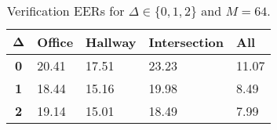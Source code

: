 \begin{table}[h]
    \centering
    \begin{tabular}{|c|M{2cm}|M{2cm}|M{2cm}|M{2cm}|}
    \hline
    $\boldsymbol{\Delta}$ & \bf{Office} & \bf{Hallway} & \bf{Intersection} & \bf{All} \\ 
    \hline 
    \hline
    \bf{0} & 20.41 & 17.51 & 23.23 & 11.07 \\
    \hline
    \bf{1} & 18.44 & 15.16 & 19.98 & 8.49 \\
    \hline
    \bf{2} & 19.14 & 15.01 & 18.49 & 7.99 \\
    \hline
    \end{tabular}
    \caption{Verification EERs for $\Delta \in \{0, 1, 2\}$ and $M = 64$.}
    \label{tab:verify_adapted_wmv_M_64}
\end{table}
